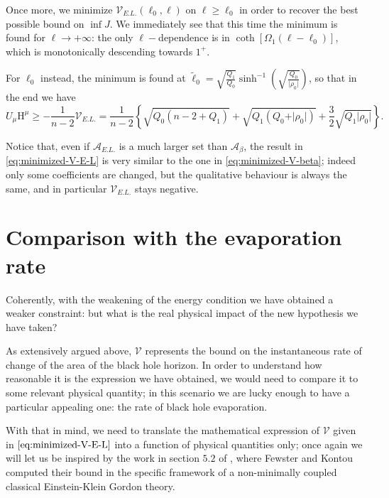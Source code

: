 Once more, we minimize \(\mathcal{V}_{E.L.}(\ell_0, \ell)\) on \(\ell \ge \ell_0\) in order to recover the best possible bound on \(\inf J\). We immediately see that this time the minimum is found for \(\ell \rightarrow +\infty\): the only \(\ell-\)dependence is in \(\coth\left[\Omega_1(\ell- \ell_0)\right]\), which is monotonically descending towards \(1^+\).

For \(\ell_0\) instead, the minimum is found at \(\tilde{\ell}_0 = \sqrt{\frac{Q_1}{Q_0}}\sinh^{-1}\left(\sqrt{\frac{Q_0}{\vert\rho_0\vert}}\right)\), so that in the end we have
{\small
\begin{equation}
	\label{eq:minimized-V-E-L}
	U_{\mu}\mathrm{H}^{\mu} \ge - \frac{1}{n - 2}\mathcal{V}_{E.L.} =  \frac{1}{n - 2} \left\{ \sqrt{Q_0(n - 2 + Q_1)} + \sqrt{Q_1(Q_0 + \vert\rho_0\vert)} + \frac{3}{2}\sqrt{Q_1\vert\rho_0\vert} \right\}.
\end{equation}}

Notice that, even if \(\mathcal{A}_{E.L.}\) is a much larger set than \(\mathcal{A}_{\beta}\), the result in \eqref{eq:minimized-V-E-L} is very similar to the one in \eqref{eq:minimized-V-beta}; indeed only some coefficients are changed, but the qualitative behaviour is always the same, and in particular \(\mathcal{V}_{E.L.}\) stays negative.

\section{Comparison with the evaporation rate}
\label{sec:physical-interpretation-V}

Coherently, with the weakening of the energy condition we have obtained a weaker constraint: but what is the real physical impact of the new hypothesis we have taken?

As extensively argued above, \(\mathcal{V}\) represents the bound on the instantaneous rate of change of the area of the black hole horizon. In order to understand how reasonable it is the expression we have obtained, we would need to compare it to some relevant physical quantity; in this scenario we are lucky enough to have a particular appealing one: the rate of black hole evaporation.

With that in mind, we need to translate the mathematical expression of \(\mathcal{V}\) given in \(\eqref{eq:minimized-V-E-L}\) into a function of physical quantities only; once again we will let us be inspired by the work in section \(5.2\) of \cite{fewster2020new}, where Fewster and Kontou computed their bound in the specific framework of a non-minimally coupled classical Einstein-Klein Gordon theory.

